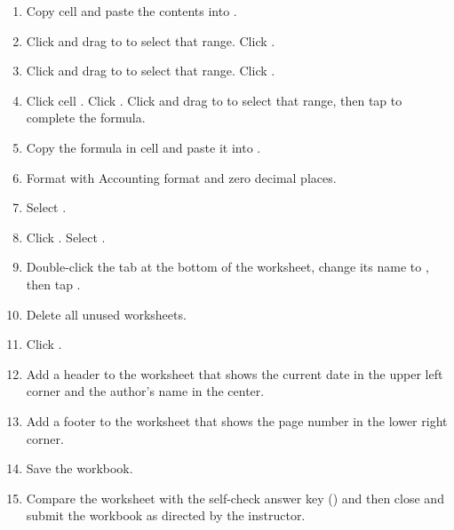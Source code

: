 \begin{enumbox}
\begin{enumerate}
		\item Copy cell  and paste the contents into .
		\item Click  and drag to  to select that range. Click .
		\item Click  and drag to  to select that range. Click .
		\item Click cell . Click . Click  and drag to  to select that range, then tap  to complete the formula.
		\item Copy the formula in cell  and paste it into .
		\item Format  with Accounting format and zero decimal places.
		\item Select .
		\item Click . Select .
		\item Double-click the  tab at the bottom of the worksheet, change its name to , then tap . 
		\item Delete all unused worksheets.
		\item Click .
		\item Add a header to the  worksheet that shows the current date in the upper left corner and the author's name in the center.
		\item Add a footer to the  worksheet that shows the page number in the lower right corner. 
		\item Save the  workbook.
		\item Compare the worksheet with the self-check answer key () and then close and submit the  workbook as directed by the instructor.
	\end{enumerate}
\end{enumbox}
	
